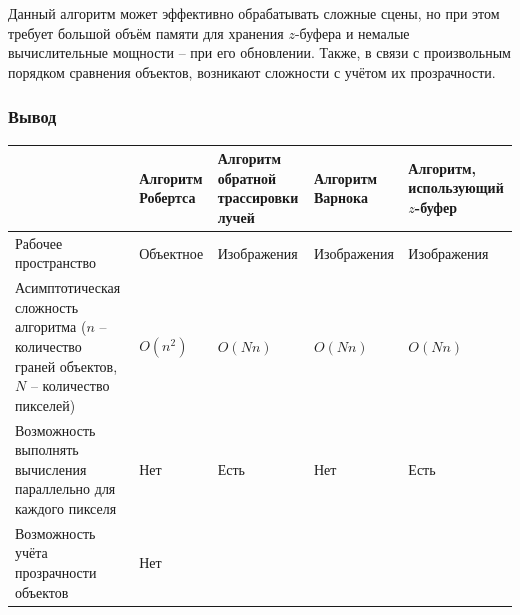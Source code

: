 Данный алгоритм может эффективно обрабатывать сложные сцены, но при этом
требует большой объём памяти для хранения $z$-буфера и немалые вычислительные
мощности -- при его обновлении. Также, в связи с произвольным порядком
сравнения объектов, возникают сложности с учётом их прозрачности.

\subsubsection{Вывод}

\noindent
\begin{adjustbox}{width=1\textwidth}
    \begin{tabular}{|p{}|p{}|p{}|p{}|p{}|}
        \hline
        &
        Алгоритм Робертса
        &
        Алгоритм обратной трассировки лучей
        &
        Алгоритм Варнока
        &
        Алгоритм, использующий $z$-буфер
        \\
        \hline
        Рабочее пространство
        &
        Объектное
        &
        Изображения
        &
        Изображения
        &
        Изображения
        \\
        \hline
        Асимптотическая сложность алгоритма ($n$ -- количество граней объектов,
        $N$ -- количество пикселей)
        &
        \cellcolor{black!12}
        $O(n^2)$
        &
        \cellcolor{black!12}
        $O(Nn)$
        &
        \cellcolor{black!12}
        $O(Nn)$
        &
        \cellcolor{black!12}
        $O(Nn)$
        \\
        \hline
        Возможность выполнять вычисления параллельно для каждого пикселя
        &
        \cellcolor{black!25}
        Нет
        &
        \cellcolor{black!5}
        Есть
        &
        \cellcolor{black!25}
        Нет
        &
        \cellcolor{black!5}
        Есть
        \\
        \hline
        Возможность учёта прозрачности объектов
        &
        \cellcolor{black!25}
        Нет
        &

\end{tabular}
\end{adjustbox}
